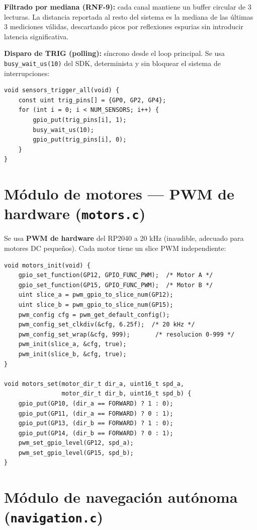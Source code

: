 \documentclass[12pt]{report}
\begin{document}
\textbf{Filtrado por mediana (RNF-9):} cada canal mantiene un buffer circular de 3 lecturas. La distancia reportada al resto del sistema es la mediana de las últimas 3 mediciones válidas, descartando picos por reflexiones espurias sin introducir latencia significativa.

\textbf{Disparo de TRIG (polling):} síncrono desde el loop principal. Se usa \texttt{busy\_wait\_us(10)} del SDK, determinista y sin bloquear el sistema de interrupciones:

\begin{lstlisting}[style=cstyle]
void sensors_trigger_all(void) {
    const uint trig_pins[] = {GP0, GP2, GP4};
    for (int i = 0; i < NUM_SENSORS; i++) {
        gpio_put(trig_pins[i], 1);
        busy_wait_us(10);
        gpio_put(trig_pins[i], 0);
    }
}
\end{lstlisting}
\newpage
\section{Módulo de motores — PWM de hardware (\texttt{motors.c})}

Se usa \textbf{PWM de hardware} del RP2040 a 20 kHz (inaudible, adecuado para motores DC pequeños). Cada motor tiene un slice PWM independiente:

\begin{lstlisting}[style=cstyle]
void motors_init(void) {
    gpio_set_function(GP12, GPIO_FUNC_PWM);  /* Motor A */
    gpio_set_function(GP15, GPIO_FUNC_PWM);  /* Motor B */
    uint slice_a = pwm_gpio_to_slice_num(GP12);
    uint slice_b = pwm_gpio_to_slice_num(GP15);
    pwm_config cfg = pwm_get_default_config();
    pwm_config_set_clkdiv(&cfg, 6.25f);  /* 20 kHz */
    pwm_config_set_wrap(&cfg, 999);       /* resolucion 0-999 */
    pwm_init(slice_a, &cfg, true);
    pwm_init(slice_b, &cfg, true);
}

void motors_set(motor_dir_t dir_a, uint16_t spd_a,
                motor_dir_t dir_b, uint16_t spd_b) {
    gpio_put(GP10, (dir_a == FORWARD) ? 1 : 0);
    gpio_put(GP11, (dir_a == FORWARD) ? 0 : 1);
    gpio_put(GP13, (dir_b == FORWARD) ? 1 : 0);
    gpio_put(GP14, (dir_b == FORWARD) ? 0 : 1);
    pwm_set_gpio_level(GP12, spd_a);
    pwm_set_gpio_level(GP15, spd_b);
}
\end{lstlisting}
\newpage
\section{Módulo de navegación autónoma (\texttt{navigation.c})}
\end{document}
